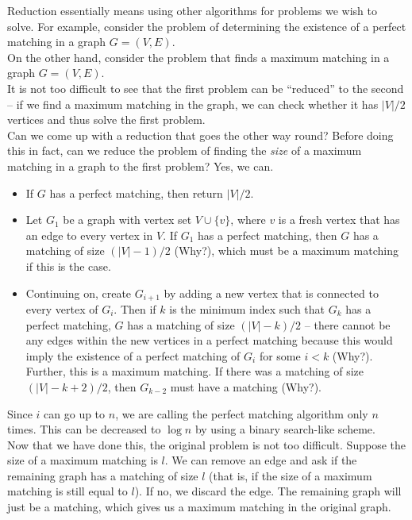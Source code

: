 Reduction essentially means using other algorithms for problems we wish to solve. For example, consider the problem of determining the existence of a perfect matching in a graph $G=(V,E)$.\\
On the other hand, consider the problem that finds a maximum matching in a graph $G=(V,E)$.\\
It is not too difficult to see that the first problem can be ``reduced'' to the second -- if we find a maximum matching in the graph, we can check whether it has $|V|/2$ vertices and thus solve the first problem.\\
Can we come up with a reduction that goes the other way round? Before doing this in fact, can we reduce the problem of finding the \textit{size} of a maximum matching in a graph to the first problem? Yes, we can.
\begin{itemize}
	\item If $G$ has a perfect matching, then return $|V|/2$.
	\item Let $G_1$ be a graph with vertex set $V\cup\{v\}$, where $v$ is a fresh vertex that has an edge to every vertex in $V$. If $G_1$ has a perfect matching, then $G$ has a matching of size $(|V|-1)/2$ (Why?), which must be a maximum matching if this is the case.
	\item Continuing on, create $G_{i+1}$ by adding a new vertex that is connected to every vertex of $G_{i}$. Then if $k$ is the minimum index such that $G_k$ has a perfect matching, $G$ has a matching of size $(|V|-k)/2$ -- there cannot be any edges within the new vertices in a perfect matching because this would imply the existence of a perfect matching of $G_i$ for some $i<k$ (Why?). Further, this is a maximum matching. If there was a matching of size $(|V|-k+2)/2$, then $G_{k-2}$ must have a matching (Why?).
\end{itemize}
Since $i$ can go up to $n$, we are calling the perfect matching algorithm only $n$ times. This can be decreased to $\log n$ by using a binary search-like scheme.\\
Now that we have done this, the original problem is not too difficult. Suppose the size of a maximum matching is $l$. We can remove an edge and ask if the remaining graph has a matching of size $l$ (that is, if the size of a maximum matching is still equal to $l$). If no, we discard the edge. The remaining graph will just be a matching, which gives us a maximum matching in the original graph.